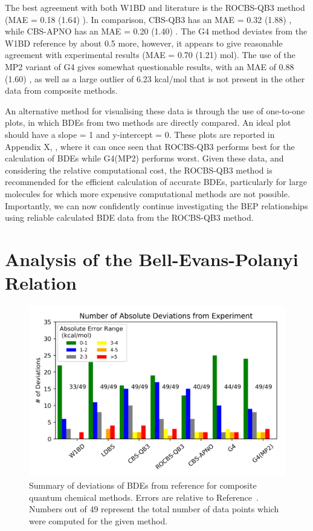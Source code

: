 
The best agreement with both W1BD and literature is the ROCBS-QB3 method (MAE = 0.18 (1.64) \kcalmol). In comparison, CBS-QB3 has an MAE = 0.32 (1.88) \kcalmol, while CBS-APNO has an MAE = 0.20 (1.40) \kcalmol.  The G4 method deviates from the W1BD reference by about 0.5 \kcalmol more, however, it appears to give reasonable agreement with experimental results (MAE = 0.70 (1.21) mol). The use of the MP2 variant of G4 gives somewhat questionable results, with an MAE of 0.88 (1.60) \kcalmol, as well as a large outlier of 6.23 kcal/mol that is not present in the other data from composite methods.

An alternative method for visualising these data is through the use of one-to-one plots, in which BDEs from two methods are directly compared. An ideal plot should have a slope = 1 and y-intercept = 0. These plots are reported in Appendix X, , where it can once seen that ROCBS-QB3 performs best for the calculation of BDEs while G4(MP2) performs worst. Given these data, and considering the relative computational cost, the ROCBS-QB3 method is recommended for the efficient calculation of accurate BDEs, particularly for large molecules for which more expensive computational methods are not possible. Importantly, we can now confidently continue investigating the BEP relationships using reliable calculated BDE data from the ROCBS-QB3 method.

\section{Analysis of the Bell-Evans-Polanyi Relation}



\newpage
{}
\begin{figure}[htb]
  \centering
  \includegraphics[width=\textwidth]{figures/bde-mae-barchart}
  \caption{Summary of deviations of BDEs from reference for composite quantum chemical methods. Errors are relative to Reference~. Numbers out of 49 represent the total number of data points which were computed for the given method.}
\end{figure}

